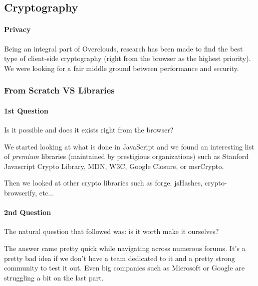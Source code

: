 
\subsection{Cryptography}
\paragraph{Privacy} Being an integral part of Overclouds, research has been made to find the best type of client-side cryptography (right from the browser as the highest priority). We were looking for a fair middle ground between performance and security.

\subsubsection{From Scratch VS Libraries}
\paragraph{1st Question} Is it possible and does it exists right from the browser?

We started looking at what is done in JavaScript and we found an interesting list of \textit{premium} libraries (maintained by prestigious organizations) such as Stanford Javascript Crypto Library\cite{Stark2009SymmetricJavascript}, MDN\cite{MDN2015MDNCrypto}, W3C\cite{Sleevi2014WebAPI}, Google Closure\cite{Google2015ClosureLibrary}, or msrCrypto\cite{Microsoft2015MSRLibrary}.

Then we looked at other crypto libraries such as forge\cite{DigitalBazaar2016Forge}, jsHashes\cite{Johnston2015JsHashes}, crypto-browserify\cite{Tarr2013Crypto-Browserify}, etc...

\paragraph{2nd Question} The natural question that followed was: is it worth make it ourselves?

The answer came pretty quick while navigating across numerous forums. It's a pretty bad idea if we don't have a team dedicated to it and a pretty strong community to test it out. Even big companies such as Microsoft or Google are struggling a bit on the last part.

